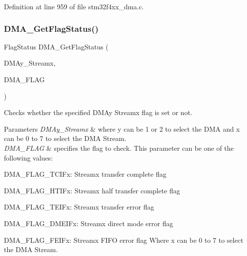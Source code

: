 Definition at line 959 of file stm32f4xx\+\_\+dma.\+c.

\mbox{\label{group___d_m_a_ga10cfc0fe31d64a1fd8fb3efb4ae2a411}} 
\subsubsection{\texorpdfstring{D\+M\+A\+\_\+\+Get\+Flag\+Status()}{DMA\_GetFlagStatus()}}
{\footnotesize\ttfamily Flag\+Status D\+M\+A\+\_\+\+Get\+Flag\+Status (\begin{DoxyParamCaption}\item[{\hyperlink{struct_d_m_a___stream___type_def}{D\+M\+A\+\_\+\+Stream\+\_\+\+Type\+Def} $\ast$}]{D\+M\+Ay\+\_\+\+Streamx,  }\item[{uint32\+\_\+t}]{D\+M\+A\+\_\+\+F\+L\+AG }\end{DoxyParamCaption})}



Checks whether the specified D\+M\+Ay Streamx flag is set or not. 


\begin{DoxyParams}{Parameters}
{\em D\+M\+Ay\+\_\+\+Streamx} & where y can be 1 or 2 to select the D\+MA and x can be 0 to 7 to select the D\+MA Stream. \\
\hline
{\em D\+M\+A\+\_\+\+F\+L\+AG} & specifies the flag to check. This parameter can be one of the following values\+: \begin{DoxyItemize}
\item D\+M\+A\+\_\+\+F\+L\+A\+G\+\_\+\+T\+C\+I\+Fx\+: Streamx transfer complete flag \item D\+M\+A\+\_\+\+F\+L\+A\+G\+\_\+\+H\+T\+I\+Fx\+: Streamx half transfer complete flag \item D\+M\+A\+\_\+\+F\+L\+A\+G\+\_\+\+T\+E\+I\+Fx\+: Streamx transfer error flag \item D\+M\+A\+\_\+\+F\+L\+A\+G\+\_\+\+D\+M\+E\+I\+Fx\+: Streamx direct mode error flag \item D\+M\+A\+\_\+\+F\+L\+A\+G\+\_\+\+F\+E\+I\+Fx\+: Streamx F\+I\+FO error flag Where x can be 0 to 7 to select the D\+MA Stream. \end{DoxyItemize}
\\
\hline
\end{DoxyParams}

